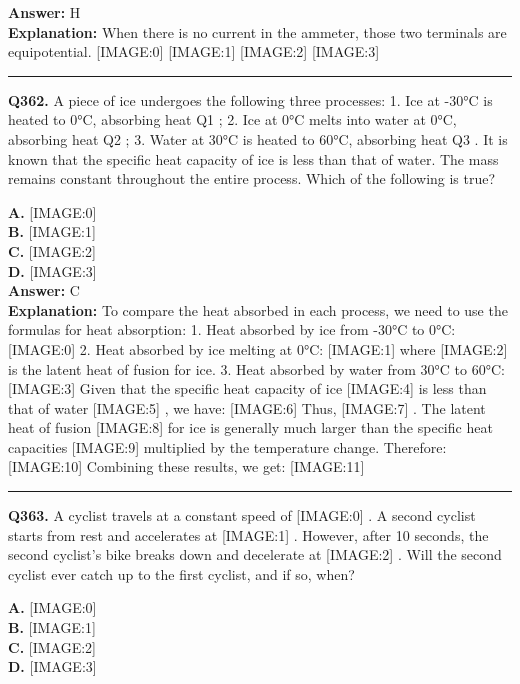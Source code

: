 \documentclass[12pt]{article}
\begin{document}
\textbf{Answer:} H \\
\textbf{Explanation:} When there is no current in the ammeter, those two terminals are equipotential.
[IMAGE:0]
[IMAGE:1]
[IMAGE:2]
[IMAGE:3]

\hrule
\vspace{1em}


\noindent
\textbf{Q362.} A piece of ice undergoes the following three processes:
1.
Ice at -30°C is heated to 0°C, absorbing heat Q1
;
2.
Ice at 0°C melts into water at 0°C, absorbing heat Q2
;
3.
Water at 30°C is heated to 60°C, absorbing heat Q3
.
It is known that the specific heat capacity of ice is less than that of water. The mass remains constant throughout the entire process. Which of the following is true?



\textbf{A.} [IMAGE:0] \\
\textbf{B.} [IMAGE:1] \\
\textbf{C.} [IMAGE:2] \\
\textbf{D.} [IMAGE:3] \\

\textbf{Answer:} C \\
\textbf{Explanation:} To compare the heat absorbed in each process, we need to use the formulas for heat absorption:
1.
Heat absorbed by ice from -30°C to 0°C:
[IMAGE:0]
2.
Heat absorbed by ice melting at 0°C:
[IMAGE:1]
where
[IMAGE:2]
is the latent heat of fusion for ice.
3.
Heat absorbed by water from 30°C to 60°C:
[IMAGE:3]
Given that the specific heat capacity of ice
[IMAGE:4]
is less than that of water
[IMAGE:5]
, we have:
[IMAGE:6]
Thus,
[IMAGE:7]
.
The latent heat of fusion
[IMAGE:8]
for ice is generally much larger than the specific heat capacities
[IMAGE:9]
multiplied by the temperature change. Therefore:
[IMAGE:10]
Combining these results, we get:
[IMAGE:11]

\hrule
\vspace{1em}


\noindent
\textbf{Q363.} A cyclist travels at a constant speed of
[IMAGE:0]
. A second cyclist starts from rest and accelerates at
[IMAGE:1]
. However, after 10 seconds, the second cyclist's bike breaks down and decelerate at
[IMAGE:2]
. Will the second cyclist ever catch up to the first cyclist, and if so, when?



\textbf{A.} [IMAGE:0] \\
\textbf{B.} [IMAGE:1] \\
\textbf{C.} [IMAGE:2] \\
\textbf{D.} [IMAGE:3] \\
\end{document}
